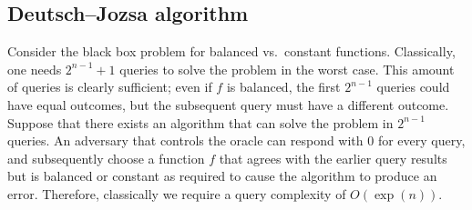 \subsection{Deutsch--Jozsa algorithm}
Consider the black box problem for balanced vs.\ constant functions.
Classically, one needs \( 2^{n-1} + 1 \) queries to solve the problem in the worst case.
This amount of queries is clearly sufficient; even if \( f \) is balanced, the first \( 2^{n-1} \) queries could have equal outcomes, but the subsequent query must have a different outcome.
Suppose that there exists an algorithm that can solve the problem in \( 2^{n-1} \) queries.
An adversary that controls the oracle can respond with 0 for every query, and subsequently choose a function \( f \) that agrees with the earlier query results but is balanced or constant as required to cause the algorithm to produce an error.
Therefore, classically we require a query complexity of \( O(\exp(n)) \).

